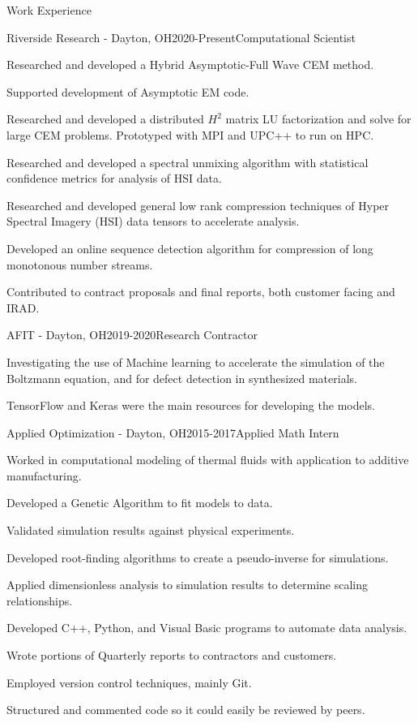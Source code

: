 \documentclass{resume} %
\begin{document}
\begin{rSection}{Work Experience}

\begin{rSubsection}{Riverside Research - Dayton, OH}{2020-Present}{Computational Scientist}{}
\item Researched and developed a Hybrid Asymptotic-Full Wave CEM method.
\item Supported development of Asymptotic EM code.
\item Researched and developed a distributed $H^2$ matrix LU factorization and solve for large CEM problems. Prototyped with MPI and UPC++ to run on HPC.
\item Researched and developed a spectral unmixing algorithm with statistical confidence metrics for analysis of HSI data.
\item Researched and developed general low rank compression techniques of Hyper Spectral Imagery (HSI) data tensors to accelerate analysis.
\item Developed an online sequence detection algorithm for compression of long monotonous number streams.
\item Contributed to contract proposals and final reports, both customer facing and IRAD.
\end{rSubsection}

\begin{rSubsection}{AFIT - Dayton, OH}{2019-2020}{Research Contractor}{}
\item Investigating the use of Machine learning to accelerate the simulation of the Boltzmann equation, and for defect detection in synthesized materials. 
\item TensorFlow and Keras were the main resources for developing the models.
\end{rSubsection}

\begin{rSubsection}{Applied Optimization - Dayton, OH}{2015-2017}{Applied Math Intern}{}
\item Worked in computational modeling of thermal fluids with application to additive manufacturing.
\item Developed a Genetic Algorithm to fit models to data.
\item Validated simulation results against physical experiments.
\item Developed root-finding algorithms to create a pseudo-inverse for simulations.
\item Applied dimensionless analysis to simulation results to determine scaling relationships.
\item Developed C++, Python, and Visual Basic programs to automate data analysis.
\item Wrote portions of Quarterly reports to contractors and customers.
\item Employed version control techniques, mainly Git.
\item Structured and commented code so it could easily be reviewed by peers.
\end{rSubsection}


\end{rSection}
\end{document}
